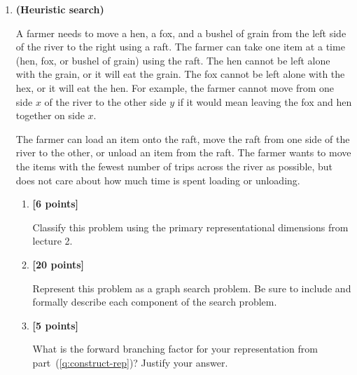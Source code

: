 \documentclass{article}
\newcounter{totalpoints}
\newcommand{\points}[1]{{\addtocounter{totalpoints}{#1}\textbf{[#1 points]}}}
\begin{document}
\begin{enumerate}
\begin{enumerate}
\item \points{5}
List the paths in the frontier at each step of a least cost search of the problem you specified in part~(\ref{q:uninformed-graph}). Also, highlight the path that will be removed from the frontier in that step. Stop when the path removed ends in a goal state.

\begin{answer}{1in}
\end{answer}

\end{enumerate}

\item \textbf{(Heuristic search)}

A farmer needs to move a hen, a fox, and a bushel of grain from the left side of the river to the right using a raft.
The farmer can take one item at a time (hen, fox, or bushel of grain) using the raft.
The hen cannot be left alone with the grain, or it will eat the grain.
The fox cannot be left alone with the hex, or it will eat the hen.
For example, the farmer cannot move from one side $x$ of the river to the other side $y$ if it would mean leaving the fox and hen together on side $x$.

The farmer can load an item onto the raft, move the raft from one side of the river to the other, or unload an item from the raft.  The farmer wants to move the items with the fewest number of trips across the river as possible, but does not care about how much time is spent loading or unloading.

\begin{enumerate}
\item \points{6} Classify this problem using the primary representational dimensions from lecture 2.

\begin{answer}{.5in}
\end{answer}

\item \points{20} \label{q:construct-rep}
Represent this problem as a graph search problem.
Be sure to include and formally describe each component of the search problem.

\begin{answer}{2.5in}
\end{answer}

\item \points{5}
What is the forward branching factor for your representation from part~(\ref{q:construct-rep})?
Justify your answer.


\end{enumerate}
\end{enumerate}
\end{document}
